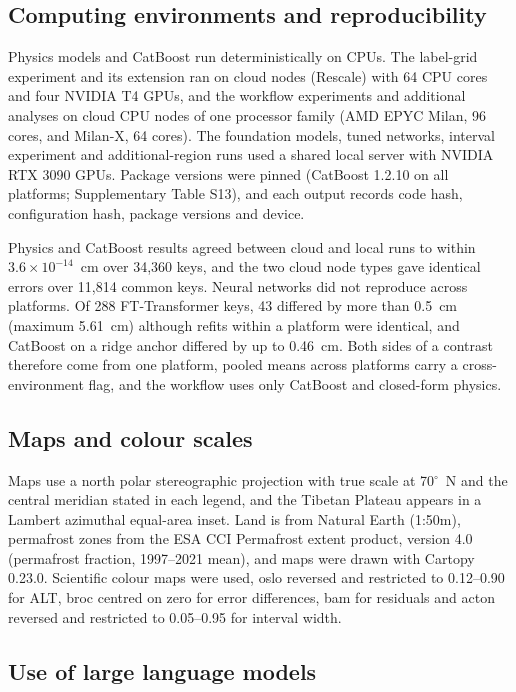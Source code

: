 \subsection{Computing environments and reproducibility}\label{sec:m-computing}

Physics models and CatBoost run deterministically on CPUs. The label-grid experiment and its extension ran on cloud nodes (Rescale) with 64 CPU cores and four NVIDIA T4 GPUs, and the workflow experiments and additional analyses on cloud CPU nodes of one processor family (AMD EPYC Milan, 96 cores, and Milan-X, 64 cores). The foundation models, tuned networks, interval experiment and additional-region runs used a shared local server with NVIDIA RTX 3090 GPUs. Package versions were pinned (CatBoost 1.2.10 on all platforms; Supplementary Table S13), and each output records code hash, configuration hash, package versions and device.

Physics and CatBoost results agreed between cloud and local runs to within $3.6 \times 10^{-14}$~cm over 34,360 keys, and the two cloud node types gave identical errors over 11,814 common keys. Neural networks did not reproduce across platforms. Of 288 FT-Transformer keys, 43 differed by more than 0.5~cm (maximum 5.61~cm) although refits within a platform were identical, and CatBoost on a ridge anchor differed by up to 0.46~cm. Both sides of a contrast therefore come from one platform, pooled means across platforms carry a cross-environment flag, and the workflow uses only CatBoost and closed-form physics.

\subsection{Maps and colour scales}\label{sec:m-maps}

Maps use a north polar stereographic projection with true scale at 70$^{\circ}$~N and the central meridian stated in each legend, and the Tibetan Plateau appears in a Lambert azimuthal equal-area inset. Land is from Natural Earth (1:50m), permafrost zones from the ESA CCI Permafrost extent product, version 4.0 (permafrost fraction, 1997--2021 mean), and maps were drawn with Cartopy 0.23.0. Scientific colour maps\cite{Crameri2018Zenodo,Crameri2020} were used, oslo reversed and restricted to 0.12--0.90 for ALT, broc centred on zero for error differences, bam for residuals and acton reversed and restricted to 0.05--0.95 for interval width.

\subsection{Use of large language models}\label{sec:m-llm}


